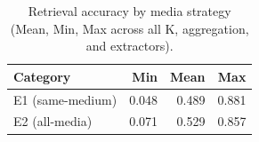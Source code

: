 \begin{table}[ht]
\centering
\caption{Retrieval accuracy by media strategy (Mean, Min, Max across all K, aggregation, and extractors).}
\label{tab:by_media}
\small
\begin{tabular}{@{}lrrr@{}}
\toprule
Category & Min & Mean & Max \\
\midrule
E1 (same-medium) & 0.048 & 0.489 & 0.881 \\
E2 (all-media) & 0.071 & 0.529 & 0.857 \\
\bottomrule
\end{tabular}
\end{table}
